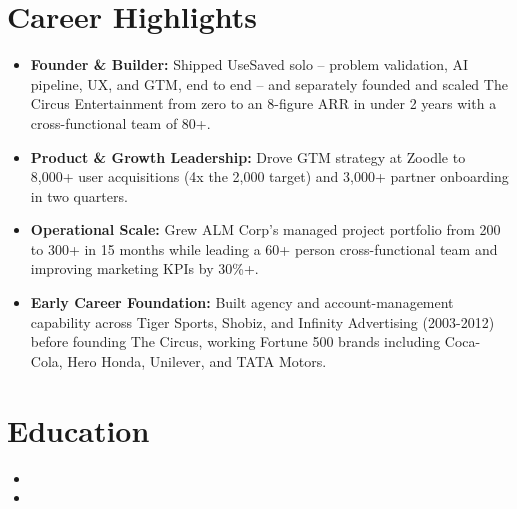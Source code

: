 \documentclass[11pt,a4paper,sans]{moderncv}
\begin{document}

\section{Career Highlights}
\vspace{1pt}
\begin{itemize}
\item \textbf{Founder \& Builder:} Shipped UseSaved solo -- problem validation, AI pipeline, UX, and GTM, end to end -- and separately founded and scaled The Circus Entertainment from zero to an 8-figure ARR in under 2 years with a cross-functional team of 80+.
\item \textbf{Product \& Growth Leadership:} Drove GTM strategy at Zoodle to 8,000+ user acquisitions (4x the 2,000 target) and 3,000+ partner onboarding in two quarters.
\item \textbf{Operational Scale:} Grew ALM Corp's managed project portfolio from 200 to 300+ in 15 months while leading a 60+ person cross-functional team and improving marketing KPIs by 30\%+.
\item \textbf{Early Career Foundation:} Built agency and account-management capability across Tiger Sports, Shobiz, and Infinity Advertising (2003-2012) before founding The Circus, working Fortune 500 brands including Coca-Cola, Hero Honda, Unilever, and TATA Motors.
\end{itemize}


\section{Education}
\vspace{1pt}
\begin{itemize}

\item{}

\vspace{3pt}

\item{}

\end{itemize}
\end{document}
